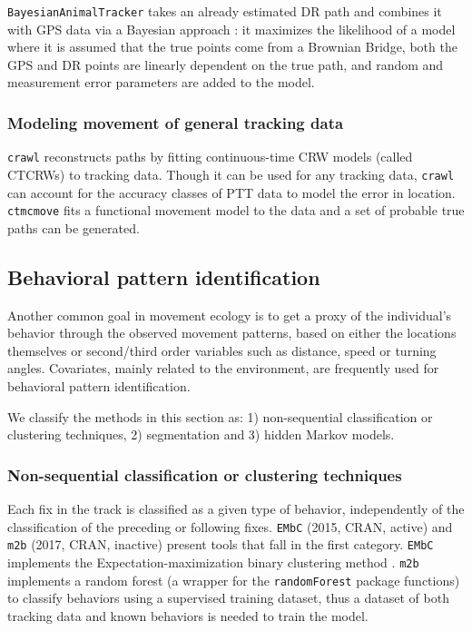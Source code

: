 \documentclass[a4paper,12pt]{article}
\newcommand{\Rpkg}[1]{\texttt{#1}}
\begin{document}
\Rpkg{BayesianAnimalTracker} takes an already estimated DR path and combines it with GPS data via a Bayesian approach \citep{Liu2016}: it maximizes the likelihood of a model where it is assumed that the true points come from a Brownian Bridge, both the GPS and DR points are linearly dependent on the true path, and random and measurement error parameters are added to the model. %

\subsubsection*{Modeling movement of general tracking data}

\Rpkg{crawl} reconstructs paths by fitting continuous-time CRW models (called CTCRWs) \citep{Johnson2008} to tracking data. Though it can be used for any tracking data, \Rpkg{crawl} can account for the accuracy classes of PTT data to model the error in location. \Rpkg{ctmcmove} fits a functional movement model \citep{Buderman2016} to the data and a set of probable true paths can be generated. 

\subsection*{Behavioral pattern identification}

Another common goal in movement ecology is to get a proxy of the individual's behavior through the observed movement patterns, based on either the locations themselves or second/third order variables such as distance, speed or turning angles. Covariates, mainly related to the environment, are frequently used for behavioral pattern identification. 

We classify the methods in this section as: 1) non-sequential classification or clustering techniques, 2) segmentation and 3) hidden Markov models.

\subsubsection*{Non-sequential classification or clustering techniques}

Each fix in the track is classified as a given type of behavior, independently of the classification of the preceding or following fixes. \Rpkg{EMbC} (2015, CRAN, active) and \Rpkg{m2b} (2017, CRAN, inactive) present tools that fall in the first category. \Rpkg{EMbC} implements the Expectation-maximization binary clustering method \citep{Garriga2016}. \Rpkg{m2b} implements a random forest (a wrapper for the \Rpkg{randomForest} package functions) to classify behaviors using a supervised training dataset, thus a dataset of both tracking data and known behaviors is needed to train the model.
\end{document}
